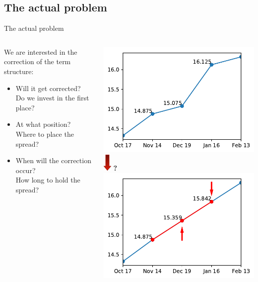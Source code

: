 \documentclass{beamer}
\begin{document}
\subsection{The actual problem}
\begin{frame}{The actual problem}	
	\begin{columns}
		\begin{column}{0.5\linewidth}
			We are interested in the \alert{correction} of the term structure:
			\begin{itemize}
				\item Will it get corrected? \\
				{\small Do we invest in the first place?}
				\item At what position? \\
				{\small Where to place the spread?}
				\item When will the correction occur? \\
				{\small How long to hold the spread?}
			\end{itemize}
		\end{column}
		\begin{column}{0.5\linewidth}
			\centering
			\includegraphics[width=0.85\linewidth]{images/termstructure_sep} \\
			\hspace{4ex} \includegraphics[width=0.4cm]{images/arrow_down_red} \hspace{1ex} {\Huge \textbf{\alert{?}}} \\
			\includegraphics[width=0.85\linewidth]{images/termstructure_sep_corr}

\end{column}
\end{columns}
\end{frame}
\end{document}
